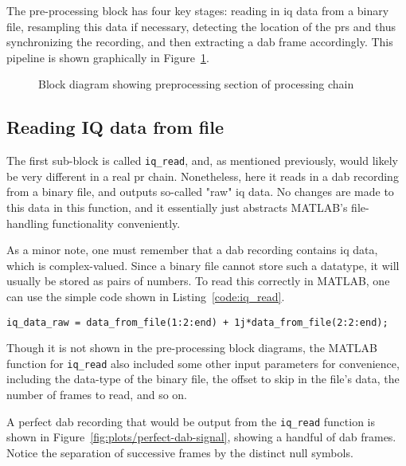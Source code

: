 \documentclass[class=report,11pt,crop=false]{standalone}
\begin{document}
The pre-processing block has four key stages: reading in \gls{iq} data from a binary file, resampling this data if necessary, detecting the location of the \gls{prs} and thus synchronizing the recording, and then extracting a \gls{dab} frame accordingly. This pipeline is shown graphically in Figure~\ref{fig:BD_Preprocess_All}.

\begin{figure}[htbp]
    \centering
    \captionsetup{type=figure}
    \def\svgwidth{\linewidth}
    { %
        }
    \caption{Block diagram showing preprocessing section of processing chain}
    \label{fig:BD_Preprocess_All}
\end{figure}

\subsection{Reading IQ data from file \label{subsect:dab-proc_iq-read}}
The first sub-block is called \texttt{iq\_read}, and, as mentioned previously, would likely be very different in a real \gls{pr} chain. Nonetheless, here it reads in a \gls{dab} recording from a binary file, and outputs so-called "raw" \gls{iq} data. No changes are made to this data in this function, and it essentially just abstracts MATLAB's file-handling functionality conveniently.

As a minor note, one must remember that a \gls{dab} recording contains \gls{iq} data, which is complex-valued. Since a binary file cannot store such a datatype, it will usually be stored as pairs of numbers. To read this correctly in MATLAB, one can use the simple code shown in Listing~\ref{code:iq_read}.

\begin{lstlisting}[caption={Creating a complex data array with the values read from a binary file},label={code:iq_read}]
iq_data_raw = data_from_file(1:2:end) + 1j*data_from_file(2:2:end);
\end{lstlisting}

Though it is not shown in the pre-processing block diagrams, the MATLAB function for \texttt{iq\_read} also included some other input parameters for convenience, including the data-type of the binary file, the offset to skip in the file's data, the number of frames to read, and so on.

A perfect \gls{dab} recording that would be output from the \texttt{iq\_read} function is shown in Figure~\ref{fig:plots/perfect-dab-signal}, showing a handful of \gls{dab} frames. Notice the separation of successive frames by the distinct null symbols.
\end{document}
